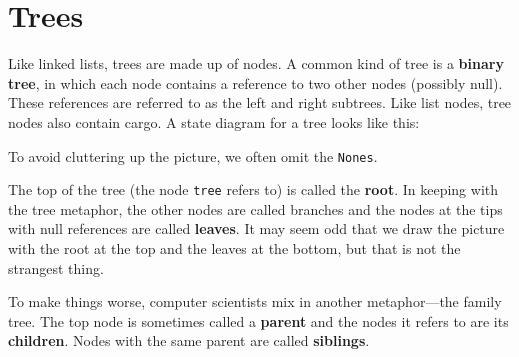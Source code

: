 

%

\chapter{Trees}

Like linked lists, trees are made up of nodes.  A common kind of tree
is a {\bf binary tree}, in which each node contains a reference to two
other nodes (possibly null).  These references are referred to as the
left and right subtrees.  Like list nodes, tree nodes also contain
cargo.  A state diagram for a tree looks like this:

\label{tree}
\beforefig
\centerline{}
\afterfig

To avoid cluttering up the picture, we often omit the
{\tt Nones}.

The top of the tree (the node {\tt tree} refers to) is called the
{\bf root}.  In keeping with the tree metaphor, the other nodes are
called branches and the nodes at the tips with null references are
called {\bf leaves}.  It may seem odd that we draw the picture with
the root at the top and the leaves at the bottom, but that is not the
strangest thing.


To make things worse, computer scientists mix in another
metaphor---the family tree.  The top node is sometimes called
a {\bf parent} and the nodes it refers to are its {\bf children}.
Nodes with the same parent are called {\bf siblings}.

